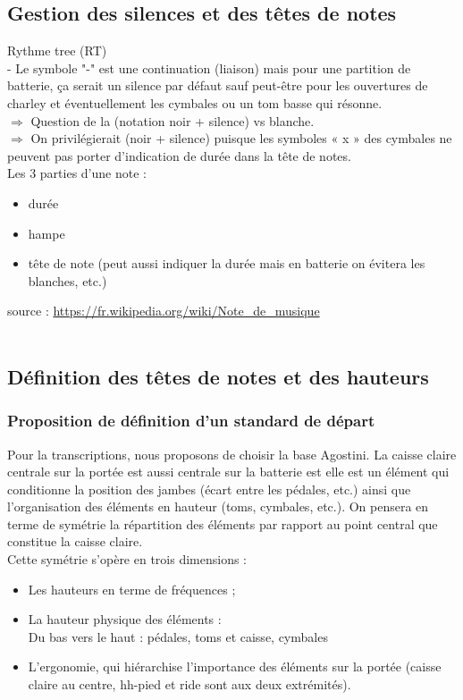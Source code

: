 \subsection*{Gestion des silences et des têtes de notes}
Rythme tree (RT)\\
- Le symbole "-" est une continuation (liaison) mais pour une partition de
batterie, ça serait un silence par défaut sauf peut-être pour les ouvertures
de charley et éventuellement les cymbales ou un tom basse qui résonne.\\
$\Rightarrow$ Question de la (notation noir + silence) vs blanche.\\
$\Rightarrow$ On privilégierait (noir + silence) puisque les symboles « x » des cymbales ne
peuvent pas porter d’indication de durée dans la tête de notes.\\
Les 3 parties d’une note :
\begin{itemize}
	\item durée
	\item hampe
	\item tête de note (peut aussi indiquer la durée mais en batterie on évitera les blanches, etc.)
\end{itemize}
source : \url{https://fr.wikipedia.org/wiki/Note_de_musique}\\\\
\subsection*{Définition des têtes de notes et des hauteurs}
\subsubsection*{Proposition de définition d’un standard de départ}
Pour la transcriptions, nous proposons de choisir la base Agostini. La caisse claire centrale sur la portée est aussi centrale sur la batterie est elle est un élément qui conditionne la position des jambes (écart entre les pédales, etc.) ainsi que l’organisation des éléments en hauteur (toms, cymbales, etc.).
On pensera en terme de symétrie la répartition des éléments par rapport au point central que constitue la caisse claire.\\
Cette symétrie s’opère en trois dimensions :
\begin{itemize}
	\item Les hauteurs en terme de fréquences ;
	\item La hauteur physique des éléments :\\
	Du bas vers le haut : pédales, toms et caisse, cymbales
	\item L’ergonomie, qui hiérarchise l’importance des éléments sur la portée (caisse claire au centre, hh-pied et ride sont aux deux extrémités).
\end{itemize}

